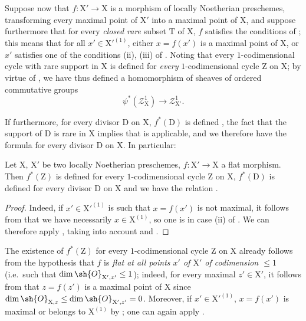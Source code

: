 \begin{env}[21.10.5]
\label{IV.21.10.5}
Suppose now that $f:\mathrm{X}'\to\mathrm{X}$ is a morphism of locally Noetherian preschemes, transforming every maximal point of $\mathrm{X}'$ into a maximal point of $\mathrm{X}$, and suppose furthermore that for every \emph{closed rare} subset $\mathrm{T}$ of $\mathrm{X}$, $f$ satisfies the conditions of ; this means that for all $x'\in\mathrm{X}'^{(1)}$, either $x=f(x')$ is a maximal point of $\mathrm{X}$, or $x'$ satisfies one of the conditions (ii), (iii) of .
Noting that every $1$-codimensional cycle with rare support in $\mathrm{X}$ is defined for \emph{every} $1$-codimensional cycle $\mathrm{Z}$ on $\mathrm{X}$; by virtue of , we have thus defined a homomorphism of sheaves of ordered commutative groups
\[
  \psi^*(\mathscr{Z}^1_{\mathrm{X}})\to\mathscr{Z}^1_{\mathrm{X}'}.
\]

If furthermore, for every divisor $\mathrm{D}$ on $\mathrm{X}$, $f^*(\mathrm{D})$ is defined , the fact that the support of $\mathrm{D}$ is rare in $\mathrm{X}$  implies that  is applicable, and we therefore have the formula  for every divisor $\mathrm{D}$ on $\mathrm{X}$.
In particular:
\end{env}

\begin{proposition}[21.10.6]
\label{IV.21.10.6}
Let $\mathrm{X}$, $\mathrm{X}'$ be two locally Noetherian preschemes, $f:\mathrm{X}'\to\mathrm{X}$ a flat morphism.
Then $f^*(\mathrm{Z})$ is defined for every $1$-codimensional cycle $\mathrm{Z}$ on $\mathrm{X}$, $f^*(\mathrm{D})$ is defined for every divisor $\mathrm{D}$ on $\mathrm{X}$ and we have the relation .
\end{proposition}

\begin{proof}
Indeed, if $x'\in\mathrm{X}'^{(1)}$ is such that $x=f(x')$ is not maximal, it follows from  that we have necessarily $x\in\mathrm{X}^{(1)}$, so one is in case (ii) of .
We can therefore apply , taking into account  and .
\end{proof}

\begin{remark}[21.10.7]
\label{IV.21.10.7}
The existence of $f^*(\mathrm{Z})$ for every $1$-codimensional cycle $\mathrm{Z}$ on $\mathrm{X}$ already follows from the hypothesis that $f$ is \emph{flat at all points $x'$ of $\mathrm{X}'$ of codimension $\leq 1$} (i.e.\ such that $\dim\sh{O}_{\mathrm{X}',x'}\leq 1$); indeed, for every maximal $z'\in\mathrm{X}'$, it follows from  that $z=f(z')$ is a maximal point of $\mathrm{X}$ since $\dim\sh{O}_{\mathrm{X},z}\leq\dim\sh{O}_{\mathrm{X}',z'}=0$.
Moreover, if $x'\in\mathrm{X}'^{(1)}$, $x=f(x')$ is maximal or belongs to $\mathrm{X}^{(1)}$ by ; one can again apply .
\end{remark}

